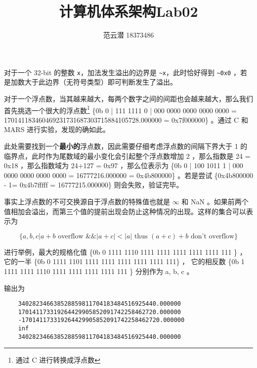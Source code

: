 \documentclass[lang=cn,11pt,a4paper,cite=authoryear]{elegantpaper}
\title{计算机体系架构\quad Lab02}
\author{范云潜 18373486}
\institute{微电子学院 184111 班}
\date{\zhtoday}
\begin{document}
\maketitle





对于一个 32-bit 的整数 \lstinline{x}，加法发生溢出的边界是 \lstinline{~x}，此时恰好得到 \lstinline{~0x0} ，若是加数大于此边界（无符号类型）即可判断发生了溢出。




对于一个浮点数，当其越来越大，每两个数字之间的间距也会越来越大，那么我们首先挑选一个很大的浮点数\footnote{通过 C 进行转换成浮点数} \{0b 0 | 111 1111 0 | 000 0000 0000 0000 0000 = 170141183460469231731687303715884105728.000000 = 0x7f000000\} 。通过 C 和 MARS 进行实验，发现的确如此。


此处需要找到一个\textbf{最小的}浮点数，因此需要仔细考虑浮点数的间隔下界大于 1 的临界点，此时作为尾数域的最小变化会引起整个浮点数增加 2 ，那么指数是 24 = 0x18 ，那么指数域为 24+127 = 0x97 ，那么位表示为 \{0b 0 | 100 1011 1 | 000 0000 0000 0000 0000 = 16777216.000000 = 0x4b800000\} 。若是尝试 \{0x4b800000 - 1= 0x4b7fffff = 16777215.000000\} 则会失败，验证完毕。


事实上浮点数的不可交换源自于浮点数的特殊值也就是 \(\infty\) 和 NaN 。如果前两个值相加会溢出，而第三个值的提前出现会防止这种情况的出现。这样的集合可以表示为

\[\{a, b, c | a + b \text{ overflow } \&\&  |a+c|< |a| \text{ thus } (a+c)+b \text{ don't overflow}\}\]

进行举例，最大的规格化值 \{0b 0 1111 1110 1111 1111 1111 1111 1111 111 \} ，它的一半 \{0b 0 1111 1101 1111 1111 1111 1111 1111 111\} ， 它的相反数  \{0b 1 1111 1111 1110 1111 1111 1111 1111 111 \} 分别作为 a, b, c 。



% 
输出为 

\begin{lstlisting}
    340282346638528859811704183484516925440.000000
    170141173319264429905852091742258462720.000000
    -170141173319264429905852091742258462720.000000
    inf
    340282346638528859811704183484516925440.000000    
\end{lstlisting}
   

\end{document}
